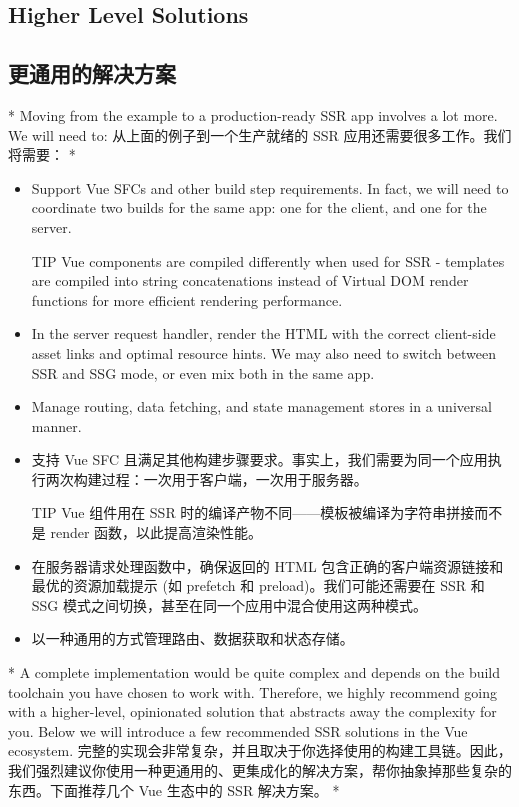 \begin{paracol}{2}
\subsection{Higher Level Solutions}
\switchcolumn
\subsection{更通用的解决方案}
\switchcolumn[0]*%
Moving from the example to a production-ready SSR app involves a lot
more. We will need to:
\switchcolumn
从上面的例子到一个生产就绪的 SSR 应用还需要很多工作。我们将需要：
\switchcolumn[0]*%
\begin{itemize}
\item
  Support Vue SFCs and other build step requirements. In fact, we will
  need to coordinate two builds for the same app: one for the client,
  and one for the server.
\begin{vueQuote}{TIP}
  Vue components are compiled differently when used for SSR - templates
  are compiled into string concatenations instead of Virtual DOM render
  functions for more efficient rendering performance.
\end{vueQuote} 
\item
  In the server request handler, render the HTML with the correct
  client-side asset links and optimal resource hints. We may also need
  to switch between SSR and SSG mode, or even mix both in the same app.
\item
  Manage routing, data fetching, and state management stores in a
  universal manner.
\end{itemize}
\switchcolumn
\begin{itemize}
\item
  支持 Vue SFC
  且满足其他构建步骤要求。事实上，我们需要为同一个应用执行两次构建过程：一次用于客户端，一次用于服务器。
\begin{vueQuote}{TIP}
  Vue 组件用在 SSR 时的编译产物不同------模板被编译为字符串拼接而不是
  render 函数，以此提高渲染性能。
\end{vueQuote} 
\item
  在服务器请求处理函数中，确保返回的 HTML
  包含正确的客户端资源链接和最优的资源加载提示 (如 prefetch 和
  preload)。我们可能还需要在 SSR 和 SSG
  模式之间切换，甚至在同一个应用中混合使用这两种模式。
\item
  以一种通用的方式管理路由、数据获取和状态存储。
\end{itemize}
\switchcolumn[0]*%
A complete implementation would be quite complex and depends on the
build toolchain you have chosen to work with. Therefore, we highly
recommend going with a higher-level, opinionated solution that abstracts
away the complexity for you. Below we will introduce a few recommended
SSR solutions in the Vue ecosystem.
\switchcolumn
完整的实现会非常复杂，并且取决于你选择使用的构建工具链。因此，我们强烈建议你使用一种更通用的、更集成化的解决方案，帮你抽象掉那些复杂的东西。下面推荐几个
Vue 生态中的 SSR 解决方案。
\switchcolumn[0]*%

\end{paracol}
